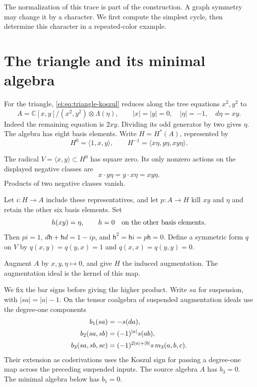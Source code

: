 The normalization of this trace is part of the construction.
A graph symmetry may change it by a character.
We first compute the simplest cycle, then determine this character
in a repeated-color example.

\section{The triangle and its minimal algebra}
\label{ei:gio:sec:operations}

For the triangle, \eqref{ei:eq:triangle-koszul} reduces
along the tree equations $x^2,y^2$ to
\begin{equation}\label{ei:gio:eq:triangle}
 A=\mathbb C[x,y]/(x^2,y^2)\otimes\Lambda(\eta),
 \qquad |x|=|y|=0,\quad |\eta|=-1,\quad d\eta=xy.
\end{equation}
Indeed the remaining equation is $2xy$. Dividing its
odd generator by two gives $\eta$.
The algebra has eight basis elements. Write $H=H^*(A)$, represented by
\begin{equation}\label{ei:gio:eq:triangle-cohomology}
 H^0=\langle1,x,y\rangle,\qquad
 H^{-1}=\langle x\eta,y\eta,xy\eta\rangle.
\end{equation}

The radical $V=\langle x,y\rangle\subset H^0$ has square
zero. Its only nonzero actions on the displayed negative
classes are
\[
 x\cdot y\eta=y\cdot x\eta=xy\eta.
\]
Products of two negative classes vanish.

Let $i:H\to A$ include these representatives, and let
$p:A\to H$ kill $xy$ and $\eta$ and retain the other six
basis elements. Set
\[
 \mathsf h(xy)=\eta,\qquad
 \mathsf h=0\quad\hbox{on the other basis elements}.
\]
Then $pi=1$, $d\mathsf h+\mathsf h d=1-ip$, and
$\mathsf h^2=\mathsf h i=p\mathsf h=0$.
Define a symmetric form $q$ on $V$ by
$q(x,y)=q(y,x)=1$ and $q(x,x)=q(y,y)=0$.

Augment $A$ by $x,y,\eta\mapsto0$, and give $H$ the induced
augmentation. The augmentation ideal is the kernel of this map.

We fix the bar signs before giving the higher product.
Write $sa$ for suspension, with $|sa|=|a|-1$.
On the tensor coalgebra of suspended augmentation ideals
use the degree-one components
\begin{align}
 b_1(sa)&=-s(da),\notag\\
 b_2(sa,sb)&=(-1)^{|a|}s(ab),\notag\\
 b_3(sa,sb,sc)&=(-1)^{2|a|+|b|}s\,m_3(a,b,c).
 \label{ei:gio:eq:bar-signs}
\end{align}
Their extension as coderivations uses the Koszul sign
for passing a degree-one map across the preceding
suspended inputs. The source algebra $A$ has $b_3=0$.
The minimal algebra below has $b_1=0$.

